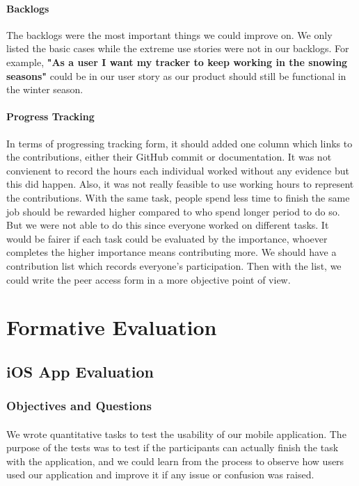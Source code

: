 \documentclass[12pt,a4paper]{article}
\begin{document}
        \paragraph{Backlogs} The backlogs were the most important things we could improve on. We only listed the basic cases while the extreme use stories were not in our backlogs. For example, {\bf "As a user I want my tracker to keep working in the snowing seasons"} could be in our user story as our product should still be functional in the winter season.

        \paragraph{Progress Tracking} In terms of progressing tracking form, it should added one column which links to the contributions, either their GitHub commit or documentation. It was not convienent to record the hours each individual worked without any evidence but this did happen. Also, it was not really feasible to use working hours to represent the contributions. With the same task, people spend less time to finish the same job should be rewarded higher compared to who spend longer period to do so. But we were not able to do this since everyone worked on different tasks. It would be fairer if each task could be evaluated by the importance, whoever completes the higher importance means contributing more. We should have a contribution list which records everyone's participation. Then with the list, we could write the peer access form in a more objective point of view.

    \section{Formative Evaluation}
      \label{Chapter:Formative Evaluation}
      \subsection{iOS App Evaluation} 
        
        \subsubsection{Objectives and Questions}
          \paragraph{}
            We wrote quantitative tasks to test the usability of our mobile application\cite{WritingTasks}. The purpose of the tests was to test if the participants can actually finish the task with the application, and we could learn from the process to observe how users used our application and improve it if any issue or confusion was raised. 
\end{document}
